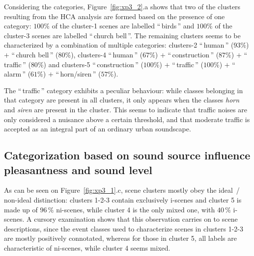 \documentclass[twoside,twocolumn]{article}
\begin{document}

Considering the categories, Figure~\ref{fig:xp3_2}.a  shows that two of the clusters resulting from the HCA analysis are formed based on the presence of one category: $100\%$ of the cluster-1 scenes are labelled ``\,birds\,'' and  $100\%$ of the cluster-3 scenes are labelled  ``\,church bell\,''. The remaining clusters seems to be characterized by a combination of multiple categories: clusters-2  ``\,human\,'' ($93\%$) $+$  ``\,church bell\,'' ($80\%$),  clusters-4  ``\,human\,'' ($67\%$) $+$  ``\,construction\,'' ($87\%$) $+$ ``\,traffic\,'' ($80\%$)   and clusters-5  ``\,construction\,'' ($100\%$) $+$ ``\,traffic\,'' ($100\%$) $+$ ``\,alarm\,'' ($61\%$) $+$ ``\,horn/siren\,'' ($57\%$). 



The ``\,traffic\,'' category exhibits a peculiar behaviour: while classes belonging in that category are present in all clusters, it only appears when the classes \textit{horn} and  \textit{siren} are present in the cluster. This seems to indicate that traffic noises are only considered a nuisance above a certain threshold, and that moderate traffic is accepted as an integral part of an ordinary urban soundscape.


\subsection{Categorization based on sound source influence pleasantness and sound level}

As can be seen on Figure~\ref{fig:xp3_1}.c, scene clusters mostly obey the ideal~/ non-ideal distinction: clusters 1-2-3 contain exclusively i-scenes and cluster 5 is made up of $96\,\%$ ni-scenes, while cluster 4 is the only mixed one, with $40\,\%$ i-scenes. A cursory examination shows that this observation carries on to scene descriptions, since the event classes used to characterize scenes in clusters 1-2-3 are mostly positively connotated, whereas for those in cluster 5, all labels are characteristic of ni-scenes, while cluster 4 seems mixed.
\end{document}

